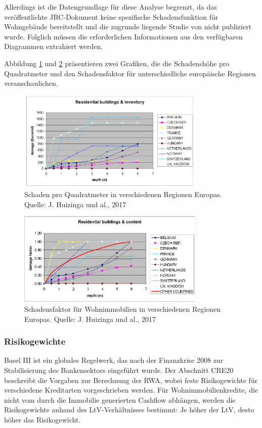 Allerdings ist die Datengrundlage für diese Analyse begrenzt, da das veröffentlichte \acs{JRC}-Dokument keine spezifische Schadensfunktion für Wohngebäude bereitstellt und die zugrunde liegende Studie von \textcite{huizinga2007flood} nicht publiziert wurde. Folglich müssen die erforderlichen Informationen aus den verfügbaren Diagrammen extrahiert werden.

Abbildung \ref{fig:damage_curve1} und \ref{fig:damage_curve2} präsentieren zwei Grafiken, die die Schadenshöhe pro Quadratmeter und den Schadensfaktor für unterschiedliche europäische Regionen veranschaulichen.

\begin{figure}[H]
    \centering
    \includegraphics[width=0.8\textwidth]{figures/RREdamagem2.png}
    \caption{Schaden pro Quadratmeter in verschiedenen Regionen Europas. Quelle: J. Huizinga und al., 2017}
    \label{fig:damage_curve1}
\end{figure}

\begin{figure}[H]
    \centering
    \includegraphics[width=0.8\textwidth]{figures/RREdamage.png}
    \caption{Schadensfaktor für Wohnimmobilien in verschiedenen Regionen Europas. Quelle: J. Huizinga und al., 2017}
    \label{fig:damage_curve2}
\end{figure}

\subsubsection{Risikogewichte}
Basel III ist ein globales Regelwerk, das nach der Finanzkrise 2008 zur Stabilisierung des Bankensektors eingeführt wurde. Der Abschnitt \acs{CRE}20 beschreibt die Vorgaben zur Berechnung der \ac{RWA}, wobei feste Risikogewichte für verschiedene Kreditarten vorgeschrieben werden. Für Wohnimmobilienkredite, die nicht vom durch die Immobilie generierten Cashflow abhängen, werden die Risikogewichte anhand des \ac{LtV}-Verhältnisses bestimmt: Je höher der \ac{LtV}, desto höher das Risikogewicht.

